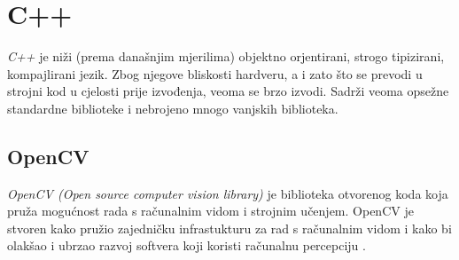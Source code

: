 \section{C++}
\label{sec:c++}

\emph{C++} je niži (prema današnjim mjerilima) objektno orjentirani, strogo tipizirani, kompajlirani jezik. Zbog njegove bliskosti hardveru, a i zato što se prevodi u strojni kod u cjelosti prije izvođenja, veoma se brzo izvodi. Sadrži veoma opsežne standardne biblioteke i nebrojeno mnogo vanjskih biblioteka.

\subsection{OpenCV}
\label{subsec:opencv}

\emph{OpenCV (Open source computer vision library)}  je biblioteka otvorenog koda koja pruža mogućnost rada s računalnim vidom i strojnim učenjem. OpenCV je stvoren kako pružio zajedničku infrastukturu za rad s računalnim vidom i kako bi olakšao i ubrzao razvoj softvera koji koristi računalnu percepciju \citep{OpenCV}.